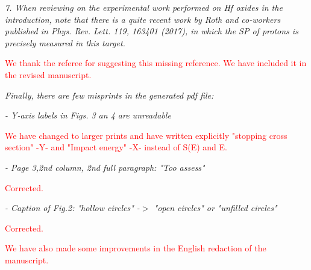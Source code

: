 \documentclass[a4paper,10pt]{article}
\def\reviewer#1{\vspace{0.35cm}\textsl{#1}}
\def\reply#1{\vspace{0.1cm}\textcolor{red}{#1}}
\begin{document}
\reviewer{
7. When reviewing on the experimental work performed on Hf oxides in
the introduction, note that there is a quite recent work by Roth and
co-workers published in Phys. Rev. Lett. 119, 163401 (2017), in which
the SP of protons is precisely measured in this target.}

\reply{We thank the referee for suggesting this missing reference. We have included it in the revised manuscript.}

\reviewer{Finally, there are few misprints in the generated pdf file:}

\reviewer{- Y-axis labels in Figs. 3 an 4 are unreadable }

\reply{We have changed to larger prints  and have written explicitly "stopping cross section" -Y- and "Impact energy" -X- instead of S(E) and E. }

\reviewer{- Page 3,2nd column, 2nd full paragraph: "Too assess"}

\reply{Corrected.}

\reviewer{- Caption of Fig.2: "hollow circles" -$>$ "open circles" or
"unfilled circles"}

\reply{Corrected.}

\reply{We have also made some improvements in the English redaction of the manuscript.}
\end{document}
